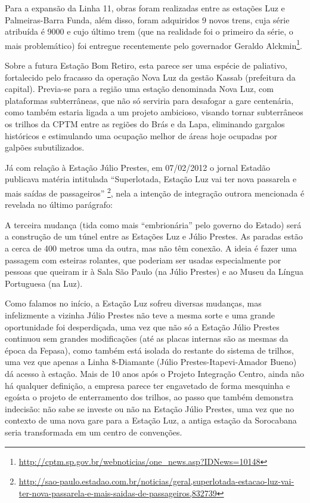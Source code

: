 \documentclass[11pt,fleqn]{book} %
\begin{document}

Para a expansão da Linha 11, obras foram realizadas entre as estações Luz e Palmeiras-Barra Funda, além disso, foram adquiridos 9 novos trens, cuja série atribuída é 9000 e cujo último trem (que na realidade foi o primeiro da série, o mais problemático) foi entregue recentemente pelo governador Geraldo Alckmin\footnote{\url{http://cptm.sp.gov.br/webnoticias/one_news.asp?IDNews=10148}}.

Sobre a futura Estação Bom Retiro, esta parece ser uma espécie de paliativo, fortalecido pelo fracasso da operação Nova Luz da gestão Kassab (prefeitura da capital). Previa-se para a região uma estação denominada Nova Luz, com plataformas subterrâneas, que não só serviria para desafogar a gare centenária, como também estaria ligada a um projeto ambicioso, visando tornar subterrâneos os trilhos da CPTM entre as regiões do Brás e da Lapa, eliminando gargalos históricos e estimulando uma ocupação melhor de áreas hoje ocupadas por galpões subutilizados.

Já com relação à Estação Júlio Prestes, em 07/02/2012 o jornal Estadão publicava matéria intitulada ``Superlotada, Estação Luz vai ter nova passarela e mais saídas de passageiros'' \footnote{\url{http://sao-paulo.estadao.com.br/noticias/geral,superlotada-estacao-luz-vai-ter-nova-passarela-e-mais-saidas-de-passageiros,832739}}, nela a intenção de integração outrora mencionada é revelada no último parágrafo:

\begin{citacao}
	A terceira mudança (tida como mais “embrionária” pelo governo do Estado) será a construção de um túnel entre as Estações Luz e Júlio Prestes. As paradas estão a cerca de 400 metros uma da outra, mas não têm conexão. A ideia é fazer uma passagem com esteiras rolantes, que poderiam ser usadas especialmente por pessoas que queiram ir à Sala São Paulo (na Júlio Prestes) e ao Museu da Língua Portuguesa (na Luz).
\end{citacao}

Como falamos no início, a Estação Luz sofreu diversas mudanças, mas infelizmente a vizinha Júlio Prestes não teve a mesma sorte e uma grande oportunidade foi desperdiçada, uma vez que não só a Estação Júlio Prestes continuou sem grandes modificações (até as placas internas são as mesmas da época da Fepasa), como também está isolada do restante do sistema de trilhos, uma vez que apenas a Linha 8-Diamante (Júlio Prestes-Itapevi-Amador Bueno) dá acesso à estação. Mais de 10 anos após o Projeto Integração Centro, ainda não há qualquer definição, a empresa parece ter engavetado de forma mesquinha e egoísta o projeto de enterramento dos trilhos, ao passo que também demonstra indecisão: não sabe se investe ou não na Estação Júlio Prestes, uma vez que no contexto de uma nova gare para a Estação Luz, a antiga estação da Sorocabana seria transformada em um centro de convenções.
\end{document}
